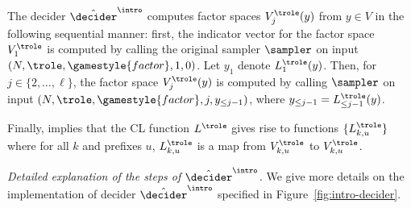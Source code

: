 The decider $\tdint$ computes factor spaces $V_j^\trole(y)$ from $y \in
V$ in the following sequential manner: first, the indicator vector for the
factor space $V^\trole_1$ is computed by calling the original sampler $\sampler$
on input $(N,\trole,\gamestyle{factor},1,0)$.
Let $y_1$ denote $L_1^\trole(y)$.
Then, for $j \in \{2,\ldots,\ell\}$, the factor space $V^\trole_j(y)$ is
computed by calling $\sampler$ on input $(N,\trole,\gamestyle{factor},j,y_{\le
  j-1})$, where $y_{\le j-1} = L^\trole_{\leq j-1}(y)$.

Finally,  implies that the CL function $L^\trole$ gives rise to functions $\{ L_{k,u}^\trole \}$ where for all $k$ and prefixes $u$, $L_{k,u}^\trole$ is a map from $V_{k,u}^\trole$ to $V_{k,u}^\trole$.

\medskip
\emph{Detailed explanation of the steps of $\tdint$.}
We give more details on the implementation of decider $\tdint$
specified in Figure~\ref{fig:intro-decider}.

